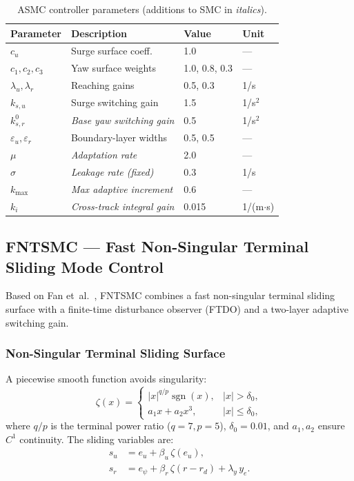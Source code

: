 \documentclass[review]{cas-dc}
\begin{document}
\begin{appendices}
\begin{table}[h]
\centering
\caption{ASMC controller parameters (additions to SMC in \textit{italics}).}
\label{tab:asmc_params}
\begin{tabular}{llll}
\toprule
Parameter & Description & Value & Unit \\
\midrule
$c_u$ & Surge surface coeff. & 1.0 & --- \\
$c_1, c_2, c_3$ & Yaw surface weights & 1.0, 0.8, 0.3 & --- \\
$\lambda_u, \lambda_r$ & Reaching gains & 0.5, 0.3 & 1/s \\
$k_{s,u}$ & Surge switching gain & 1.5 & 1/s$^2$ \\
$k_{s,r}^0$ & \textit{Base yaw switching gain} & 0.5 & 1/s$^2$ \\
$\varepsilon_u, \varepsilon_r$ & Boundary-layer widths & 0.5, 0.5 & --- \\
\textit{$\mu$} & \textit{Adaptation rate} & 2.0 & --- \\
\textit{$\sigma$} & \textit{Leakage rate (fixed)} & 0.3 & 1/s \\
\textit{$k_{\max}$} & \textit{Max adaptive increment} & 0.6 & --- \\
\textit{$k_i$} & \textit{Cross-track integral gain} & 0.015 & 1/(m$\cdot$s) \\
\bottomrule
\end{tabular}
\end{table}


\subsection{FNTSMC --- Fast Non-Singular Terminal Sliding Mode Control}
\label{sec:app_fntsmc}

Based on Fan et~al.\ \citep{Fan2021}, FNTSMC combines a fast non-singular terminal sliding surface with a finite-time disturbance observer (FTDO) and a two-layer adaptive switching gain.

\subsubsection{Non-Singular Terminal Sliding Surface}

A piecewise smooth function avoids singularity:
\begin{equation}
\zeta(x) = \begin{cases}
|x|^{q/p}\operatorname{sgn}(x), & |x| > \delta_0, \\
a_1 x + a_2 x^3, & |x| \leq \delta_0,
\end{cases}
\label{eq:fntsmc_zeta}
\end{equation}
where $q/p$ is the terminal power ratio ($q = 7, p = 5$), $\delta_0 = 0.01$, and $a_1, a_2$ ensure $C^1$ continuity. The sliding variables are:
\begin{align}
s_u &= e_u + \beta_u\,\zeta(e_u), \label{eq:fntsmc_su}\\
s_r &= e_\psi + \beta_r\,\zeta(r - r_d) + \lambda_y\,y_e. \label{eq:fntsmc_sr}
\end{align}


\end{appendices}
\end{document}
